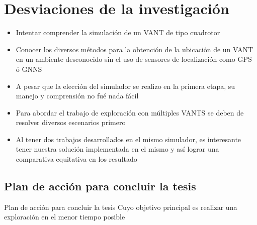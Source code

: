\documentclass[24pt,aspectratio=169]{beamer}
\begin{document}
\section{Desviaciones de la investigación}
\begin{frame}
  \begin{itemize}
  \item Intentar comprender la simulación de un VANT de tipo cuadrotor
  \item Conocer los diversos métodos para la obtención de la ubicación de un VANT en un ambiente desconocido sin el uso de sensores de localización como GPS ó GNNS 
  \item A pesar que la elección del simulador se realizo en la primera etapa, su manejo y comprensión no fué nada fácil
  \item Para abordar el trabajo de exploración con múltiples VANTS se deben de resolver diversos escenarios primero
  \item Al tener dos trabajos desarrollados en el mismo simulador, es interesante tener nuestra solución implementada en el mismo y así lograr una comparativa equitativa en los resultado
  \end{itemize}
\end{frame}

\subsection{Plan de acción para concluir la tesis}
\begin{frame}{Plan de acción para concluir la tesis}
  Cuyo objetivo principal es realizar una exploración en el menor tiempo posible
\end{frame}
\end{document}
